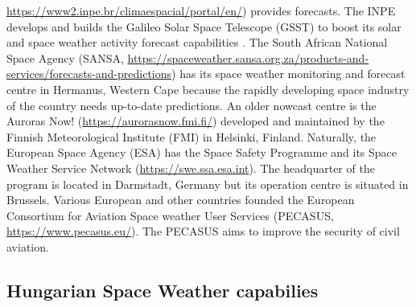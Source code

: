 \documentclass[sn-aps]{sn-jnl}%
\begin{document}
\url{https://www2.inpe.br/climaespacial/portal/en/}) provides forecasts. The INPE develops and builds the Galileo Solar Space Telescope (GSST) to boost its solar and space weather activity forecast capabilities \cite{pesquisas18:_galil_solar_space_teles_mission_study_repor}. The South African National Space Agency (SANSA, \url{https://spaceweather.sansa.org.za/products-and-services/forecasts-and-predictions}) has its space weather monitoring and forecast centre in Hermanus, Western Cape because the rapidly developing space industry of the country needs up-to-date predictions. An older nowcast centre is the Auroras Now! (\url{https://aurorasnow.fmi.fi/}) developed and maintained by the Finnish Meteorological Institute (FMI) in Helsinki, Finland. Naturally, the European Space Agency (ESA) has the Space Safety Programme and its Space Weather Service Network (\url{https://swe.ssa.esa.int}). The headquarter of the program is located in Darmstadt, Germany but its operation centre is situated in Brussels. Various European and other countries founded the European Consortium for Aviation Space weather User Services (PECASUS, \url{https://www.pecasus.eu/}). The PECASUS aims to improve the security of civil aviation.  


\subsection{Hungarian Space Weather capabilies}
\label{sec:hunswcap}
\end{document}
